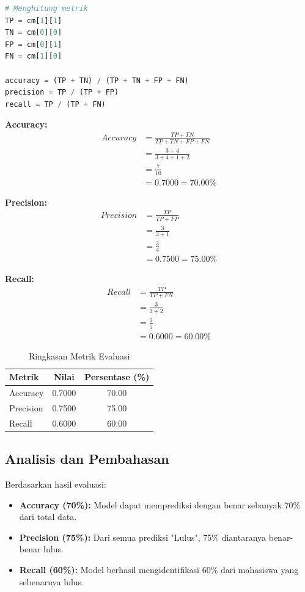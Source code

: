 \documentclass[12pt,a4paper]{article}
\begin{document}
\begin{lstlisting}[language=Python, caption=Menghitung Metrik Evaluasi]
# Menghitung metrik
TP = cm[1][1]
TN = cm[0][0]
FP = cm[0][1]
FN = cm[1][0]

accuracy = (TP + TN) / (TP + TN + FP + FN)
precision = TP / (TP + FP)
recall = TP / (TP + FN)
\end{lstlisting}

\textbf{Accuracy:}
\begin{align*}
Accuracy &= \frac{TP + TN}{TP + TN + FP + FN} \\
&= \frac{3 + 4}{3 + 4 + 1 + 2} \\
&= \frac{7}{10} \\
&= 0.7000 = 70.00\%
\end{align*}

\textbf{Precision:}
\begin{align*}
Precision &= \frac{TP}{TP + FP} \\
&= \frac{3}{3 + 1} \\
&= \frac{3}{4} \\
&= 0.7500 = 75.00\%
\end{align*}

\textbf{Recall:}
\begin{align*}
Recall &= \frac{TP}{TP + FN} \\
&= \frac{3}{3 + 2} \\
&= \frac{3}{5} \\
&= 0.6000 = 60.00\%
\end{align*}

\begin{table}[H]
\centering
\caption{Ringkasan Metrik Evaluasi}
\begin{tabular}{|l|c|c|}
\hline
\textbf{Metrik} & \textbf{Nilai} & \textbf{Persentase (\%)} \\
\hline
Accuracy & 0.7000 & 70.00 \\
Precision & 0.7500 & 75.00 \\
Recall & 0.6000 & 60.00 \\
\hline
\end{tabular}
\end{table}

\subsection{Analisis dan Pembahasan}
Berdasarkan hasil evaluasi:
\begin{itemize}
    \item \textbf{Accuracy (70\%):} Model dapat memprediksi dengan benar sebanyak 70\% dari total data.
    \item \textbf{Precision (75\%):} Dari semua prediksi "Lulus", 75\% diantaranya benar-benar lulus.
    \item \textbf{Recall (60\%):} Model berhasil mengidentifikasi 60\% dari mahasiswa yang sebenarnya lulus.
\end{itemize}
\end{document}
